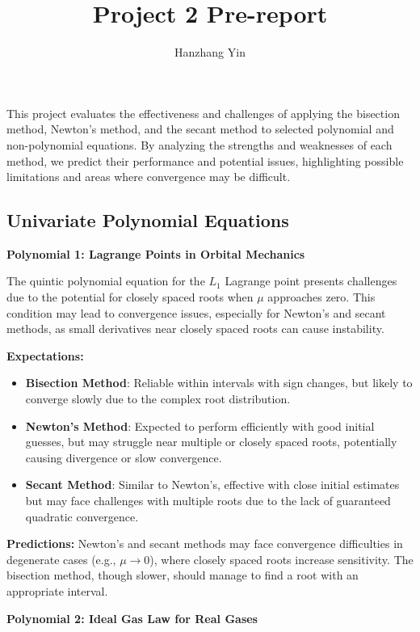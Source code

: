 \documentclass[12pt]{article}
\title{\vspace{-2cm}Project 2 Pre-report}
\author{Hanzhang Yin}
\begin{document}
\maketitle

\noindent This project evaluates the effectiveness and challenges of applying the bisection method, Newton's method, and the secant method to selected polynomial and non-polynomial equations. By analyzing the strengths and weaknesses of each method, we predict their performance and potential issues, highlighting possible limitations and areas where convergence may be difficult.

\subsection*{Univariate Polynomial Equations}

\noindent \textbf{Polynomial 1: Lagrange Points in Orbital Mechanics}

\noindent The quintic polynomial equation for the \( L_1 \) Lagrange point presents challenges due to the potential for closely spaced roots when \( \mu \) approaches zero. This condition may lead to convergence issues, especially for Newton’s and secant methods, as small derivatives near closely spaced roots can cause instability.

\noindent \textbf{Expectations:}
\begin{itemize}
    \item \textbf{Bisection Method}: Reliable within intervals with sign changes, but likely to converge slowly due to the complex root distribution.
    \item \textbf{Newton’s Method}: Expected to perform efficiently with good initial guesses, but may struggle near multiple or closely spaced roots, potentially causing divergence or slow convergence.
    \item \textbf{Secant Method}: Similar to Newton's, effective with close initial estimates but may face challenges with multiple roots due to the lack of guaranteed quadratic convergence.
\end{itemize}

\noindent \textbf{Predictions:}  
Newton’s and secant methods may face convergence difficulties in degenerate cases (e.g., \( \mu \rightarrow 0 \)), where closely spaced roots increase sensitivity. The bisection method, though slower, should manage to find a root with an appropriate interval.

\noindent \textbf{Polynomial 2: Ideal Gas Law for Real Gases}
\end{document}
